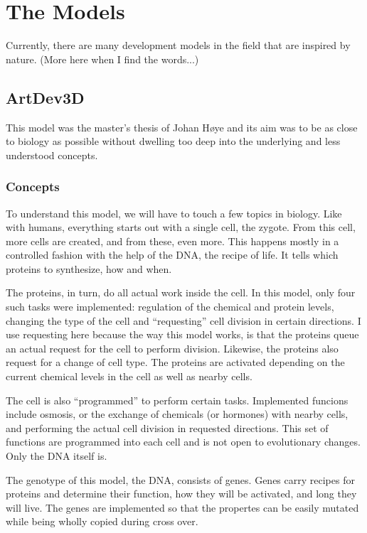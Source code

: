 \section{The Models}

Currently, there are many development models in the field that are inspired by nature. (More here when I find the words...)

\subsection{ArtDev3D}
This model was the master's thesis of Johan H{\o}ye\cite{hoye2006} and its aim was to be as close to biology as possible without dwelling too deep into the underlying and less understood concepts.

\subsubsection{Concepts}
To understand this model, we will have to touch a few topics in biology. Like with humans, everything starts out with a single cell, the zygote. From this cell, more cells are created, and from these, even more. This happens mostly in a controlled fashion with the help of the DNA, the recipe of life. It tells which proteins to synthesize, how and when.

The proteins, in turn, do all actual work inside the cell. In this model, only four such tasks were implemented: regulation of the chemical and protein levels, changing the type of the cell and ``requesting'' cell division in certain directions. I use requesting here because the way this model works, is that the proteins queue an actual request for the cell to perform division. Likewise, the proteins also request for a change of cell type. The proteins are activated depending on the current chemical levels in the cell as well as nearby cells.

The cell is also ``programmed'' to perform certain tasks. Implemented funcions include osmosis, or the exchange of chemicals (or hormones) with nearby cells, and performing the actual cell division in requested directions. This set of functions are programmed into each cell and is not open to evolutionary changes. Only the DNA itself is.

The genotype of this model, the DNA, consists of genes. Genes carry recipes for proteins and determine their function, how they will be activated, and long they will live. The genes are implemented so that the propertes can be easily mutated while being wholly copied during cross over.

